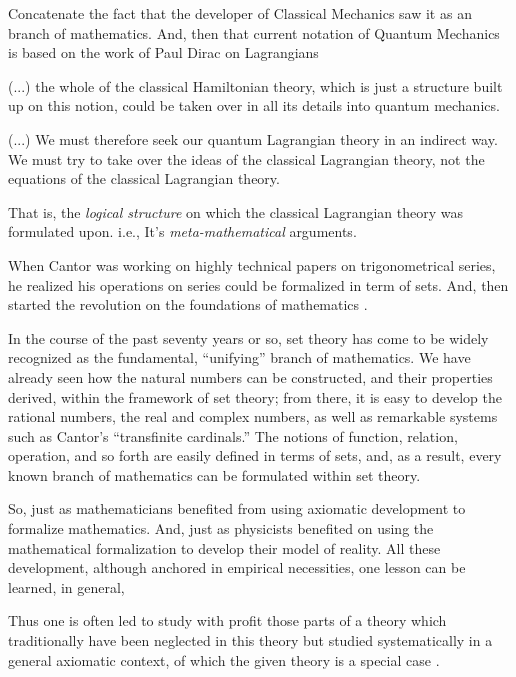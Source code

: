 \documentclass[
12pt,				%
openright,			%
oneside,			%
a4paper,			%
brazil,				%
english,			%
]{abntex2}
\begin{document}
Concatenate the fact that the developer of Classical Mechanics saw it
as an branch of mathematics. And, then that current notation of
Quantum Mechanics is based on the work of Paul Dirac on Lagrangians\cite{dirac2005lagrangian}

\begin{citacao}
(...) the whole of the classical Hamiltonian theory, which is just a structure built up on this notion, could be taken over in all its details into quantum mechanics.
  
(...) We must therefore seek our quantum Lagrangian theory in an
indirect way. We must try to take over the ideas of the classical
Lagrangian theory, not the equations of the classical Lagrangian
theory. \cite{dirac2005lagrangian}
\end{citacao}

That is, the \textit{logical structure} on which the classical
Lagrangian theory was formulated upon. i.e., It's \textit{meta-mathematical} arguments.

When Cantor was working on highly technical papers on trigonometrical
series, he realized his operations on series could be formalized in
term of sets. And, then started the revolution on the foundations of mathematics \cite{pinter2014book}.

\begin{citacao}
In the course of the past seventy years or so, set theory has come to be
widely recognized as the fundamental, “unifying” branch of mathematics. We
have already seen how the natural numbers can be constructed, and
their properties derived, within the framework of set theory; from
there, it is easy to develop the rational numbers, the real and
complex numbers, as well as remarkable systems such as Cantor’s
“transfinite cardinals.” The notions of function, relation, operation,
and so forth are easily defined in terms of sets, and, as a result,
every known branch of mathematics can be formulated within set
theory. \cite{pinter2014book}
\end{citacao}

So, just as mathematicians benefited from using axiomatic
development to formalize mathematics. And, just as physicists
benefited on using the mathematical formalization to develop their
model of reality. All these development, although anchored in
empirical necessities, one lesson can be learned, in general,

\begin{citacao}
  Thus one is often led to study with profit those parts of a
  theory which traditionally have been neglected in this theory but studied
  systematically in a general axiomatic context, of which the given theory
  is a special case \cite{bourbaki2004theory}.
\end{citacao}
\end{document}
